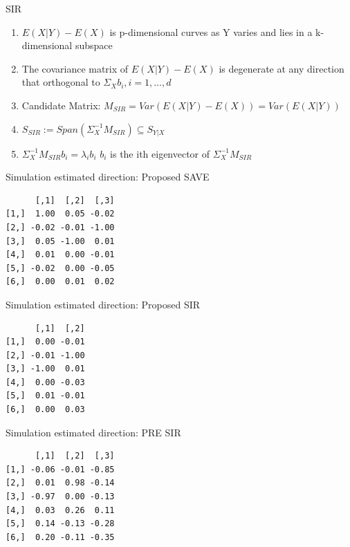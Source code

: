 \documentclass[ignorenonframetext,]{beamer}
\providecommand{\tightlist}{%
  \setlength{\itemsep}{0pt}\setlength{\parskip}{0pt}}
\begin{document}
\begin{frame}{SIR}

\begin{enumerate}
\def\labelenumi{\arabic{enumi}.}
\tightlist
\item
  \(E(X|Y) - E(X)\) is p-dimensional curves as Y varies and lies in a
  k-dimensional subspace
\item
  The covariance matrix of \(E(X|Y) - E(X)\) is degenerate at any
  direction that orthogonal to \(\Sigma_{X}b_i,i = 1, \dots, d\)
\item
  Candidate Matrix: \(M_{SIR} = Var(E(X|Y) - E(X)) = Var(E(X|Y))\)
\item
  \(S_{SIR} := Span(\Sigma_{X}^{-1}M_{SIR}) \subseteq S_{Y|X}\)
\item
  \(\Sigma_{X}^{-1}M_{SIR}b_i = \lambda_i b_i\) \(b_i\) is the ith
  eigenvector of \(\Sigma_{X}^{-1}M_{SIR}\)
\end{enumerate}

\end{frame}

\begin{frame}[fragile]{Simulation estimated direction: Proposed SAVE}

\begin{verbatim}
      [,1]  [,2]  [,3]
[1,]  1.00  0.05 -0.02
[2,] -0.02 -0.01 -1.00
[3,]  0.05 -1.00  0.01
[4,]  0.01  0.00 -0.01
[5,] -0.02  0.00 -0.05
[6,]  0.00  0.01  0.02
\end{verbatim}

\end{frame}

\begin{frame}[fragile]{Simulation estimated direction: Proposed SIR}

\begin{verbatim}
      [,1]  [,2]
[1,]  0.00 -0.01
[2,] -0.01 -1.00
[3,] -1.00  0.01
[4,]  0.00 -0.03
[5,]  0.01 -0.01
[6,]  0.00  0.03
\end{verbatim}

\end{frame}

\begin{frame}[fragile]{Simulation estimated direction: PRE SIR}

\begin{verbatim}
      [,1]  [,2]  [,3]
[1,] -0.06 -0.01 -0.85
[2,]  0.01  0.98 -0.14
[3,] -0.97  0.00 -0.13
[4,]  0.03  0.26  0.11
[5,]  0.14 -0.13 -0.28
[6,]  0.20 -0.11 -0.35
\end{verbatim}

\end{frame}
\end{document}
